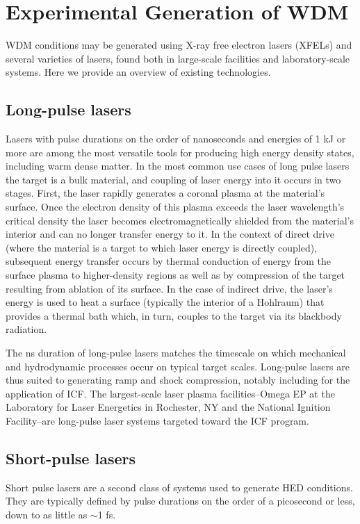 \documentclass [11pt, proquest, article] {uwthesis}[2016/11/22]
\begin{document}
\section{Experimental Generation of WDM}
WDM conditions may be generated using X-ray free electron lasers (XFELs) and several varieties of lasers, found both in large-scale facilities and laboratory-scale systems. Here we provide an overview of existing technologies. 
\subsection{Long-pulse lasers}
Lasers with pulse durations on the order of nanoseconds and energies of 1 kJ or more are among the most versatile tools for producing high energy density states, including warm dense matter. In the most common use cases of long pulse lasers the target is a bulk material, and coupling of laser energy into it occurs in two stages. First, the laser rapidly  generates a coronal plasma at the material's surface. Once the electron density of this plasma exceeds the laser wavelength's critical density  the laser becomes electromagnetically shielded from the material's interior and can no longer transfer energy to it. In the context of direct drive (where the material is a target to which laser energy is directly coupled), subsequent energy transfer occurs by thermal conduction of energy from the surface plasma to higher-density regions as well as by compression of the target resulting from ablation of its surface. In the case of indirect drive, the laser's energy is used to heat a surface (typically the interior of a Hohlraum) that provides a thermal bath which, in turn, couples to the target via its blackbody radiation. 

The ns duration of long-pulse lasers matches the timescale on which mechanical and hydrodynamic processes occur on typical target scales. Long-pulse lasers are thus suited to generating ramp and shock compression, notably including for the application of ICF. The largest-scale laser plasma facilities--Omega EP at the Laboratory for Laser Energetics in Rochester, NY and the National Ignition Facility--are long-pulse laser systems targeted toward the ICF program.


\subsection{Short-pulse lasers}
Short pulse lasers are a second class of systems used to generate HED conditions. They are typically defined by pulse durations on the order of a picosecond or less, down to as little as $\sim$1 fs. 
\end{document}
